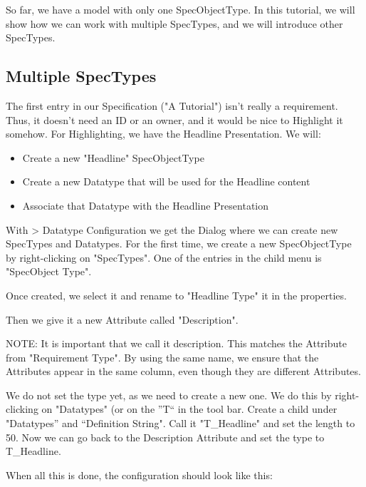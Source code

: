 So far, we have a model with only one SpecObjectType.  In this tutorial, we will show how we can work with multiple SpecTypes, and we will introduce other SpecTypes.

\subsection{Multiple SpecTypes}

The first entry in our Specification ("A \pror{} Tutorial") isn't really a requirement.  Thus, it doesn't need an ID or an owner, and it would be nice to Highlight it somehow.  For Highlighting, we have the Headline Presentation.  We will:

\begin{itemize}

\item
  Create a new "Headline" SpecObjectType
\item
  Create a new Datatype that will be used for the Headline content
\item
  Associate that Datatype with the Headline Presentation
\end{itemize}

With \pror{} \textgreater{} Datatype Configuration we get the Dialog where we can create new SpecTypes and Datatypes.  For the first time, we create a new SpecObjectType by right-clicking on "SpecTypes".  One of the entries in the child menu is "SpecObject Type".

Once created, we select it and rename to "Headline Type" it in the properties.

Then we give it a new Attribute called "Description".

NOTE: It is important that we call it description.  This matches the Attribute from "Requirement Type".  By using the same name, we ensure that the Attributes appear in the same column, even though they are different Attributes.

We do not set the type yet, as we need to create a new one.  We do this by right-clicking on "Datatypes" (or on the ''T`` in the tool bar.  Create a child under "Datatypes'' and  ``Definition String".  Call it "T\_Headline" and set the length to 50.  Now we can go back to the Description Attribute and set the type to T\_Headline.

When all this is done, the configuration should look like this:


